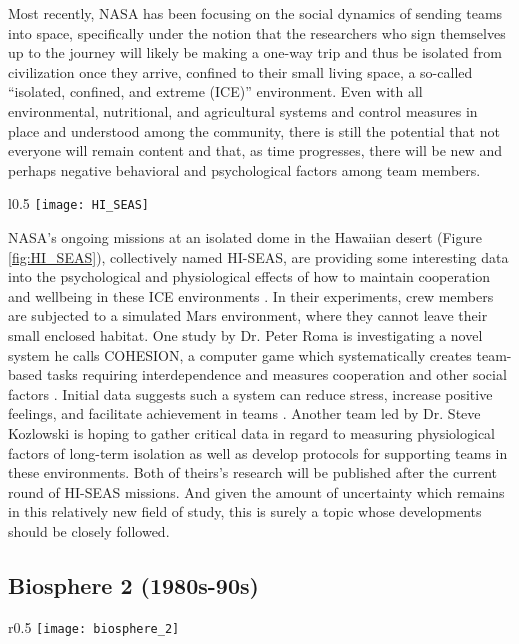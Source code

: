 Most recently, NASA has been focusing on the social dynamics of sending teams into space, specifically under the notion that the researchers who sign themselves up to the journey will likely be making a one-way trip and thus be isolated from civilization once they arrive, confined to their small living space, a so-called “isolated, confined, and extreme (ICE)” environment. Even with all environmental, nutritional, and agricultural systems and control measures in place and understood among the community, there is still the potential that not everyone will remain content and that, as time progresses, there will be new and perhaps negative behavioral and psychological factors among team members.

\begin{wrapfigure}{l}{0.5\textwidth}
    \centering
    \texttt{[image: HI\_SEAS]}
    \caption{NASA HI-SEAS}
    \label{fig:HI_SEAS}
\end{wrapfigure}

NASA’s ongoing missions at an isolated dome in the Hawaiian desert (Figure \ref{fig:HI_SEAS}), collectively named HI-SEAS, are providing some interesting data into the psychological and physiological effects of how to maintain cooperation and wellbeing in these ICE environments \cite{HI_SEAS}.  In their experiments, crew members are subjected to a simulated Mars environment, where they cannot leave their small enclosed habitat. One study by Dr. Peter Roma is investigating a novel system he calls COHESION, a computer game which systematically creates team-based tasks requiring interdependence and measures cooperation and other social factors \cite{social_dimensions}. Initial data suggests such a system can reduce stress, increase positive feelings, and facilitate achievement in teams \cite{HI_SEAS}. Another team led by Dr. Steve Kozlowski is hoping to gather critical data in regard to measuring physiological factors of long-term isolation as well as develop protocols for supporting teams in these environments. Both of theirs’s research will be published after the current round of HI-SEAS missions. And given the amount of uncertainty which remains in this relatively new field of study, this is surely a topic whose developments should be closely followed.

\subsection{Biosphere 2 (1980s-90s)}
\begin{wrapfigure}{r}{0.5\textwidth}
    \centering
    \texttt{[image: biosphere\_2]}
    \caption{Biosphere 2}
    \label{fig:biosphere_2}
\end{wrapfigure}

